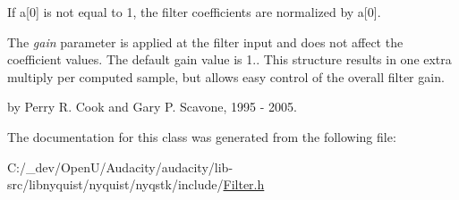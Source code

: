 If a\mbox{[}0\mbox{]} is not equal to 1, the filter coefficients are normalized by a\mbox{[}0\mbox{]}.

The {\itshape gain} parameter is applied at the filter input and does not affect the coefficient values. The default gain value is 1.. This structure results in one extra multiply per computed sample, but allows easy control of the overall filter gain.

by Perry R. Cook and Gary P. Scavone, 1995 -\/ 2005. 

The documentation for this class was generated from the following file\+:\begin{DoxyCompactItemize}
\item 
C\+:/\+\_\+dev/\+Open\+U/\+Audacity/audacity/lib-\/src/libnyquist/nyquist/nyqstk/include/\hyperlink{libnyquist_2nyquist_2nyqstk_2include_2_filter_8h}{Filter.\+h}\end{DoxyCompactItemize}
